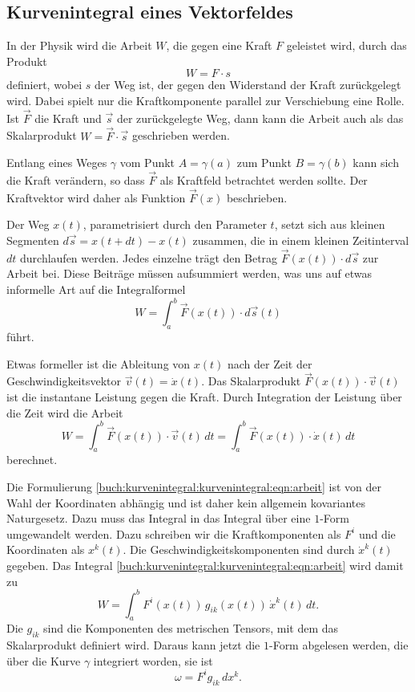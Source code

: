 %
%
\subsection{Kurvenintegral eines Vektorfeldes
\label{buch:kurvenintegral:subsection:kurvenintegralvektorfeld}}
In der Physik wird die Arbeit $W$, die gegen eine Kraft $F$ geleistet wird,
durch das Produkt
\[
W = F\cdot s
\]
definiert, wobei $s$ der Weg ist, der gegen den Widerstand der Kraft
zurückgelegt wird.
%
Dabei spielt nur die Kraftkomponente parallel zur Verschiebung eine Rolle.
Ist $\vec{F}$ die Kraft und $\vec{s}$ der zurückgelegte Weg, dann kann 
die Arbeit auch als das Skalarprodukt $W=\vec{F}\cdot\vec{s}$ geschrieben
werden.

Entlang eines Weges $\gamma$ vom Punkt $A=\gamma(a)$ zum Punkt
$B=\gamma(b)$ kann sich die Kraft verändern, so dass $\vec{F}$
als Kraftfeld betrachtet werden sollte.
Der Kraftvektor wird daher als Funktion $\vec{F}(x)$ beschrieben.

Der Weg $x(t)$, parametrisiert durch den Parameter $t$, setzt sich aus
kleinen Segmenten $d\vec{s} = x(t+dt)-x(t)$ zusammen, die in einem
kleinen Zeitinterval $dt$ durchlaufen werden.
Jedes einzelne trägt den Betrag $\vec{F}(x(t))\cdot d\vec{s}$ zur
Arbeit bei.
Diese Beiträge müssen aufsummiert werden, was uns auf etwas informelle
Art auf die Integralformel
\[
W
=
\int_a^b \vec{F}(x(t))\cdot d\vec{s}(t)
\]
führt.

Etwas formeller ist die Ableitung von $x(t)$ nach der Zeit
der Geschwindigkeitsvektor $\vec{v}(t)=\dot{x}(t)$.
Das Skalarprodukt $\vec{F}(x(t))\cdot \vec{v}(t)$ ist die
instantane Leistung gegen die Kraft.
Durch Integration der Leistung über die Zeit wird die Arbeit
\begin{equation}
W
=
\int_a^b \vec{F}(x(t))\cdot \vec{v}(t)\,dt
=
\int_a^b \vec{F}(x(t))\cdot \dot{x}(t)\,dt
\label{buch:kurvenintegral:kurvenintegral:eqn:arbeit}
\end{equation}
berechnet.

Die Formulierung \eqref{buch:kurvenintegral:kurvenintegral:eqn:arbeit}
ist von der Wahl der Koordinaten abhängig und ist daher kein allgemein 
kovariantes Naturgesetz.
%
Dazu muss das Integral in das Integral über eine $1$-Form umgewandelt
werden.
Dazu schreiben wir die Kraftkomponenten als $F^i$ und die Koordinaten
als $x^k(t)$.
Die Geschwindigkeitskomponenten sind durch $\dot{x}^k(t)$ gegeben.
Das Integral \eqref{buch:kurvenintegral:kurvenintegral:eqn:arbeit}
wird damit zu
\[
W
=
\int_a^b F^i(x(t))\,g_{ik}(x(t))\, \dot{x}^k(t)\,dt.
\]
Die $g_{ik}$ sind die Komponenten des metrischen Tensors, mit dem
das Skalarprodukt definiert wird.
Daraus kann jetzt die $1$-Form abgelesen werden, die über die
Kurve $\gamma$ integriert worden, sie ist
\[
\omega
=
F^ig_{ik}\,dx^k.
\]


